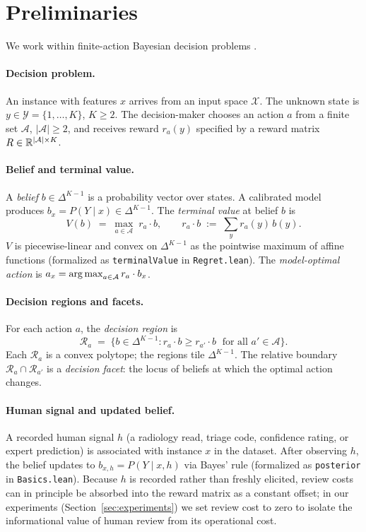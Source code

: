 \section{Preliminaries}
\label{sec:prelim}

We work within finite-action Bayesian decision problems \citep{DeGroot1970,Howard1966}.

\paragraph{Decision problem.}
An instance with features $x$ arrives from an input space $\mathcal{X}$.
The unknown state is $y \in \mathcal{Y} = \{1, \ldots, K\}$, $K \geq 2$.
The decision-maker chooses an action $a$ from a finite set $\mathcal{A}$, $|\mathcal{A}| \geq 2$, and receives reward $r_a(y)$ specified by a reward matrix $R \in \mathbb{R}^{|\mathcal{A}| \times K}$.

\paragraph{Belief and terminal value.}
A \emph{belief} $b \in \Delta^{K-1}$ is a probability vector over states.
A calibrated model produces $b_x = P(Y \mid x) \in \Delta^{K-1}$.
The \emph{terminal value} at belief $b$ is
\begin{equation}\label{eq:terminal-value}
  V(b) \;=\; \max_{a \in \mathcal{A}}\; r_a \cdot b,
  \qquad r_a \cdot b \;:=\; \textstyle\sum_y r_a(y)\, b(y).
\end{equation}
$V$ is piecewise-linear and convex on $\Delta^{K-1}$ as the pointwise maximum of affine functions (formalized as \texttt{terminalValue} in \texttt{Regret.lean}).
The \emph{model-optimal action} is $a_x = \operatorname*{arg\,max}_{a \in \mathcal{A}} r_a \cdot b_x$.

\paragraph{Decision regions and facets.}
For each action $a$, the \emph{decision region} is
\[
  \mathcal{R}_a \;=\; \bigl\{ b \in \Delta^{K-1} : r_a \cdot b \geq r_{a'} \cdot b \;\text{ for all } a' \in \mathcal{A} \bigr\}.
\]
Each $\mathcal{R}_a$ is a convex polytope; the regions tile $\Delta^{K-1}$.
The relative boundary $\mathcal{R}_a \cap \mathcal{R}_{a'}$ is a \emph{decision facet}: the locus of beliefs at which the optimal action changes.

\paragraph{Human signal and updated belief.}
A recorded human signal $h$ (a radiology read, triage code, confidence rating, or expert prediction) is associated with instance $x$ in the dataset.
After observing $h$, the belief updates to $b_{x,h} = P(Y \mid x, h)$ via Bayes' rule (formalized as \texttt{posterior} in \texttt{Basics.lean}).
Because $h$ is recorded rather than freshly elicited, review costs can in principle be absorbed into the reward matrix as a constant offset; in our experiments (Section~\ref{sec:experiments}) we set review cost to zero to isolate the informational value of human review from its operational cost.

